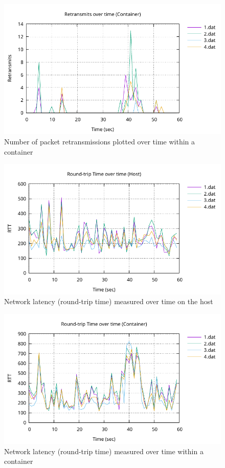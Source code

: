 \begin{figure}[H]
    \centering
    \includegraphics[width=1\textwidth]{images/results/network-retransmits-container.pdf}
    \caption{Number of packet retransmissions plotted over time within a container}
    \label{ticket-builder-class}
\end{figure}

\begin{figure}[H]
    \centering
    \includegraphics[width=1\textwidth]{images/results/network-host-rtt.pdf}
    \caption{Network latency (round-trip time) measured over time on the host}
    \label{ticket-builder-class}
\end{figure}

\begin{figure}[H]
    \centering
    \includegraphics[width=1\textwidth]{images/results/network-rtt-container.pdf}
    \caption{Network latency (round-trip time) measured over time within a container}
    \label{ticket-builder-class}
\end{figure}

